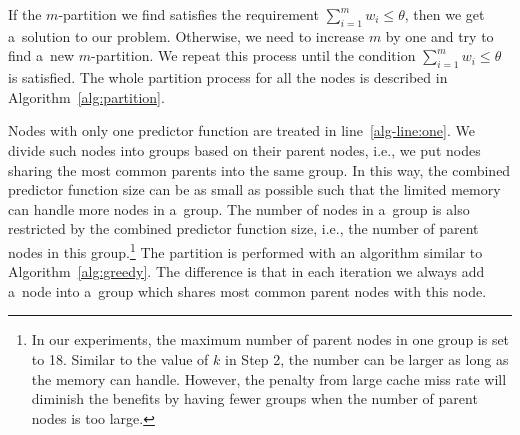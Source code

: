 \documentclass[runningheads,a4paper]{llncs}
\begin{document}
%
If the $m$-partition we find satisfies the requirement $\sum_{i=1}^{m}w_i \leq \theta$,
then we get a~solution to our problem.
Otherwise, we need to increase $m$ by one and try to find a~new $m$-partition.
We repeat this process until the condition $\sum_{i=1}^{m}w_i \leq \theta$ is satisfied.
The whole partition process for all the nodes is described in Algorithm~\ref{alg:partition}.

Nodes with only one predictor function are treated in line~\ref{alg-line:one}.
We divide such nodes into groups based on their parent nodes,
i.e., we put nodes sharing the most common parents into the same group.
In this way, the combined predictor function size can be as small as possible such that
the limited memory can handle more nodes in a~group.
The number of nodes in a~group is also restricted by the combined predictor function size,
i.e., the number of parent nodes in this group.\footnote{
In our experiments, the maximum number of parent nodes in one group is set to 18.
Similar to the value of $k$ in Step 2, the number can be larger as long as the memory can handle.
However, the penalty from large cache miss rate will diminish the benefits by having fewer groups
when the number of parent nodes is too large.}
The partition is performed with an algorithm similar to Algorithm~\ref{alg:greedy}.
The difference is that in each iteration we always add a~node into a~group which shares most common parent nodes with this node.
\end{document}
